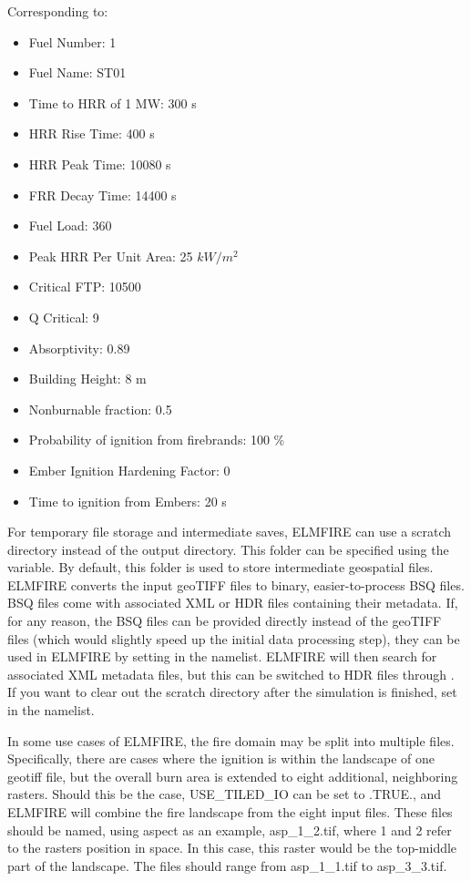 Corresponding to:
\begin{itemize}
    \item Fuel Number: 1
    \item Fuel Name: ST01
    \item Time to HRR of 1 MW: 300 s
    \item HRR Rise Time: 400 s
    \item HRR Peak Time: 10080 s
    \item FRR Decay Time: 14400 s
    \item Fuel Load: 360
    \item Peak HRR Per Unit Area: 25 $kW/m^2$
    \item Critical FTP: 10500
    \item Q Critical: 9
    \item Absorptivity: 0.89
    \item Building Height: 8 m
    \item Nonburnable fraction: 0.5
    \item Probability of ignition from firebrands: 100 \%
    \item Ember Ignition Hardening Factor: 0
    \item Time to ignition from Embers: 20 s
\end{itemize}

For temporary file storage and intermediate saves, ELMFIRE can use a scratch directory instead of the output directory. This folder can be specified using the  variable. By default, this folder is used to store intermediate geospatial files. ELMFIRE converts the input geoTIFF files to binary, easier-to-process BSQ files. BSQ files come with associated XML or HDR files containing their metadata. If, for any reason, the BSQ files can be provided directly instead of the geoTIFF files (which would slightly speed up the initial data processing step), they can be used in ELMFIRE by setting  in the  namelist. ELMFIRE will then search for associated XML metadata files, but this can be switched to HDR files through . If you want to clear out the scratch directory after the simulation is finished, set  in the  namelist.

In some use cases of ELMFIRE, the fire domain may be split into multiple files. Specifically, there are cases where the ignition is within the landscape of one geotiff file, but the overall burn area is extended to eight additional, neighboring rasters. Should this be the case, USE\_TILED\_IO can be set to .TRUE., and ELMFIRE will combine the fire landscape from the eight input files. These files should be named, using aspect as an example, asp\_1\_2.tif, where 1 and 2 refer to the rasters position in space. In this case, this raster would be the top-middle part of the landscape. The files should range from asp\_1\_1.tif to asp\_3\_3.tif. 

